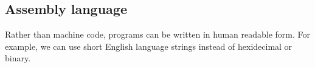 
\subsection{Assembly language}

Rather than machine code, programs can be written in human readable form. For example, we can use short English language strings instead of hexidecimal or binary.

